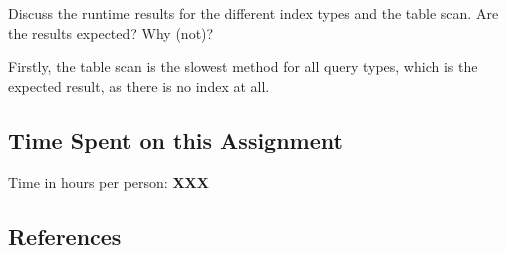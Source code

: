 \documentclass[11pt]{scrartcl}
\begin{document}
Discuss the runtime results for the different index types and the table scan. Are the results expected? Why (not)?

Firstly, the table scan is the slowest method for all query types, which is the expected result, as there is no index
at all.

\subsection*{Time Spent on this Assignment}

Time in hours per person: \textbf{XXX}

\subsection*{References}

\printbibliography
\end{document}

